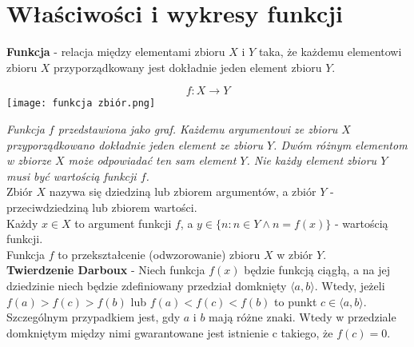 \documentclass[14pt,a4paper]{extarticle}
\begin{document}
   
   
   

\noindent\section{Właściwości i wykresy funkcji}
\noindent\textbf{Funkcja} - relacja między elementami zbioru $X$ i $Y$ taka, że każdemu elementowi
zbioru $X$ przyporządkowany jest dokładnie jeden element zbioru $Y$.

$$f:X \rightarrow Y$$
\texttt{[image: funkcja zbiór.png]}\hfill\break

\noindent \textit{Funkcja $f$ przedstawiona jako graf. Każdemu argumentowi ze zbioru $X$ przyporządkowano dokładnie jeden element ze zbioru $Y$. 
Dwóm różnym elementom w zbiorze $X$ może odpowiadać ten sam element $Y$. Nie każdy element zbioru $Y$ musi być wartością funkcji $f$.}\hfill\break\\
\noindent Zbiór $X$ nazywa się dziedziną lub zbiorem argumentów, a zbiór $Y$ - przeciwdziedziną lub zbiorem wartości.\\
Każdy $x \in X$ to argument funkcji $f$, a $y \in \{n: n \in Y \land n = f(x)\}$ - wartością funkcji.\\
Funkcja $f$ to przekształcenie (odwzorowanie) zbioru $X$ w zbiór $Y$.\hfill\break\\

\noindent\textbf{Twierdzenie Darboux} - Niech funkcja $f(x)$ będzie funkcją ciągłą, a na jej dziedzinie
niech będzie zdefiniowany przedział domknięty $\langle a, b\rangle $. Wtedy, jeżeli $f(a) > f(c) > f(b)$ lub
$f(a) < f(c) < f(b)$ to punkt $c \in \langle a, b\rangle$. Szczególnym przypadkiem jest, gdy $a$ i $b$ mają różne
znaki. Wtedy w przedziale domkniętym między nimi gwarantowane jest istnienie c takiego, że $f(c) = 0$.
\end{document}
